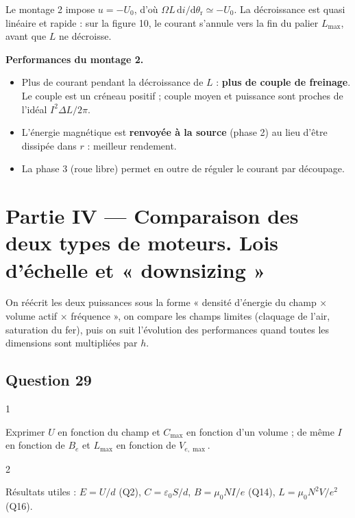 \documentclass[11pt,a4paper]{article}
\providecommand{\tightlist}{\setlength{\itemsep}{0pt}\setlength{\parskip}{0pt}}
\begin{document}
Le montage 2 impose \(u=-U_0\), d'où \(\Omega L\,\mathrm di/\mathrm d\theta_{\mathrm r}\simeq-U_0\). La décroissance est quasi linéaire et rapide : sur la figure 10, le courant s'annule vers la fin du palier \(L_{\max}\), avant que \(L\) ne décroisse.

\textbf{Performances du montage 2.}

\begin{itemize}
\tightlist
\item
  Plus de courant pendant la décroissance de \(L\) : \textbf{plus de couple de freinage}. Le couple est un créneau positif ; couple moyen et puissance sont proches de l'idéal \(I^2\Delta L/2\pi\).
\item
  L'énergie magnétique est \textbf{renvoyée à la source} (phase 2) au lieu d'être dissipée dans \(r\) : meilleur rendement.
\item
  La phase 3 (roue libre) permet en outre de réguler le courant par découpage.
\end{itemize}

\hypertarget{partie-iv-comparaison-des-deux-types-de-moteurs.-lois-duxe9chelle-et-downsizing}{%
\section{Partie IV --- Comparaison des deux types de moteurs. Lois d'échelle et « downsizing »}\label{partie-iv-comparaison-des-deux-types-de-moteurs.-lois-duxe9chelle-et-downsizing}}

On réécrit les deux puissances sous la forme « densité d'énergie du champ × volume actif × fréquence », on compare les champs limites (claquage de l'air, saturation du fer), puis on suit l'évolution des performances quand toutes les dimensions sont multipliées par \(h\).

\hypertarget{question-29}{%
\subsection{Question 29}\label{question-29}}

\begin{indication}{1}

Exprimer \(U\) en fonction du champ et \(C_{\max}\) en fonction d'un volume ; de même \(I\) en fonction de \(B_e\) et \(L_{\max}\) en fonction de \(V_{e,\max}\).

\end{indication}

\begin{indication}{2}

Résultats utiles : \(E=U/d\) (Q2), \(C=\varepsilon_0S/d\), \(B=\mu_0NI/e\) (Q14), \(L=\mu_0N^2V/e^2\) (Q16).

\end{indication}
\end{document}
